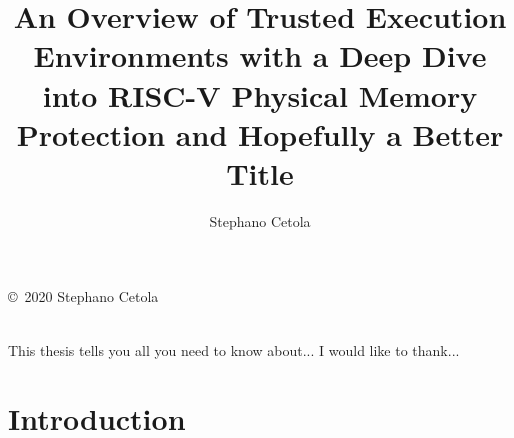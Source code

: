 \documentclass[12pt,oneside,letterpaper]{PSUreport}
\begin{document}
\title{An Overview of Trusted Execution Environments with a Deep Dive into RISC-V Physical Memory Protection and Hopefully a Better Title}
\subtitle{}
\author{Stephano Cetola}
\submitdate{\today}

\copyrightfalse
\figurespagetrue
\tablespagetrue
\null\vfill
\begin{center}
        \copyright\ 2020 Stephano Cetola \\
        \doclicenseLongText \\
        \vspace{5 mm}
        \doclicenseImage
\end{center}
\vfill\newpage
 
\beforepreface
{}
This thesis tells you all you need to know about...
I would like to thank...
\afterpreface

\printnoidxglossary[type=\acronymtype]

\glsresetall
\chapter{Introduction}




\end{document}
